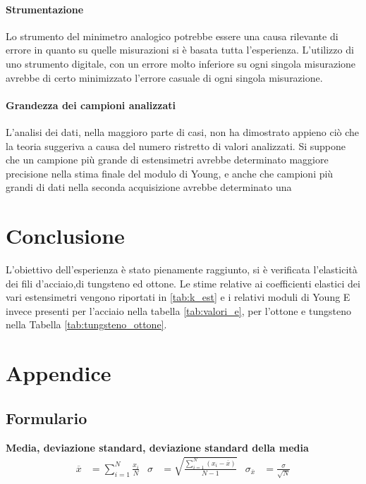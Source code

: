 \documentclass[a4paper,11pt,oneside]{article}
\begin{document}
\paragraph{Strumentazione}
Lo strumento del minimetro analogico potrebbe essere una causa rilevante di errore in quanto su quelle misurazioni si è basata tutta l'esperienza. L'utilizzo di uno strumento digitale, con un errore molto inferiore su ogni singola misurazione avrebbe di certo minimizzato l'errore casuale di ogni singola misurazione.
\paragraph{Grandezza dei campioni analizzati}
L'analisi dei dati, nella maggioro parte di casi, non ha dimostrato appieno ciò che la teoria suggeriva a causa del numero ristretto di valori analizzati. Si suppone che un campione più grande di estensimetri avrebbe determinato maggiore precisione nella stima finale del modulo di Young, e anche che campioni più grandi di dati nella seconda acquisizione avrebbe determinato una 


\section{Conclusione}
L'obiettivo dell'esperienza è stato pienamente raggiunto, si è verificata l'elasticità dei fili d'acciaio,di tungsteno ed ottone. Le stime relative ai coefficienti elastici dei vari estensimetri vengono riportati in \ref{tab:k_est} e i relativi moduli di Young E invece presenti per l'acciaio nella tabella \ref{tab:valori_e}, per l'ottone e tungsteno nella Tabella \ref{tab:tungsteno_ottone}.



\section{Appendice}

\subsection{Formulario}
\textbf{Media, deviazione standard, deviazione standard della media}
\begin{align*}
        \overline{x}&=\sum\limits_{i=1}^{N} \frac{x_{i}}{N}&
        \sigma&=\sqrt{\frac{\sum\limits_{i=1}^{N} (x_{i}-\overline{x})}{N-1}}&
        \sigma_{\overline{x}}&=\frac{\sigma}{\sqrt{N}}
\end{align*}\\
\end{document}
